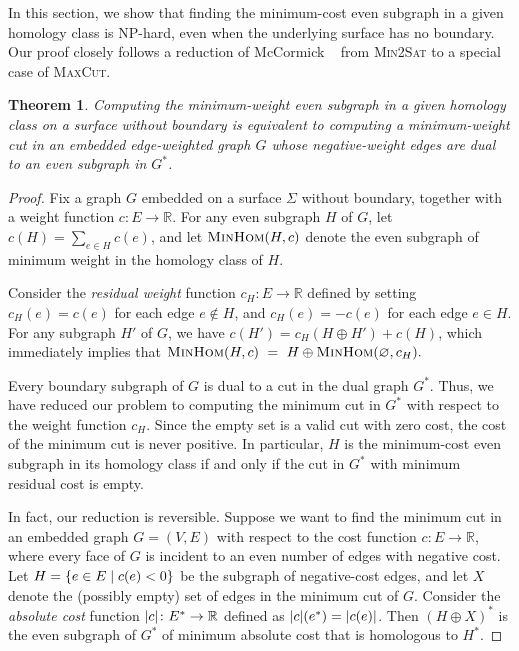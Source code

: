 \documentclass[11pt,twoside]{article}
\def\Real{\mathbb{R}}
\newtheorem{theorem}{Theorem}[section]
\begin{document}
{

In this section, we show that finding the minimum-cost even subgraph in a given homology class is {NP}-hard, even when the underlying surface has no boundary.  Our proof closely follows a reduction of McCormick \etal~\cite{mrr-edofm-03} from \textsc{Min2Sat} to a special case of \textsc{MaxCut}.

\begin{theorem}
Computing the minimum-weight even subgraph in a given homology class on a surface without boundary is equivalent to computing a minimum-weight cut in an embedded edge-weighted graph $G$ whose negative-weight edges are dual to an even subgraph in $G^*$.
\end{theorem}

\begin{proof}
Fix a graph $G$ embedded on a surface $\Sigma$ without boundary, together with a weight function $c\colon E\to \Real$.  For any even subgraph $H$ of $G$, let $c(H) = \sum_{e\in H} c(e)$, and let $\textsc{MinHom}(H,c)$ denote the even subgraph of minimum weight in the homology class of $H$.

Consider the \emph{residual weight} function $c_H\colon E\to \Real$ defined by setting $c_H(e) = c(e)$ for each edge $e\not\in H$, and $c_H(e) = -c(e)$ for each edge $e\in H$.  For any subgraph $H'$ of $G$, we have $c(H') = c_H(H\oplus H') + c(H)$, which immediately implies that
\(
    \textsc{MinHom}(H,c) ~=~
    H \oplus \textsc{MinHom}(\varnothing, c_H).
\)

Every boundary subgraph of $G$ is dual to a cut in the dual graph $G^*$.  Thus, we have reduced our problem to computing the minimum cut in $G^*$ with respect to the weight function $c_H$.  Since the empty set is a valid cut with zero cost, the cost of the minimum cut is never positive.  In particular, $H$ is the minimum-cost even subgraph in its homology class if and only if the cut in $G^*$ with minimum residual cost is empty.

In fact, our reduction is reversible.  Suppose we want to find the minimum cut in an embedded graph $G = (V, E)$ with respect to the cost function $c\colon E\to \Real$, where every face of $G$ is incident to an even number of edges with negative cost.  Let $H = \{ {e\in E}\mid {c(e)<0} \}$ be the subgraph of negative-cost edges, and let $X$ denote the (possibly empty) set of edges in the minimum cut of $G$.  Consider the \emph{absolute cost} function $\abs{c}\colon E^*\to \Real$ defined as $\mathopen| c \mathclose|(e^*) = \mathopen| c(e) \mathclose|$.  Then $(H\oplus X)^*$ is the even subgraph of $G^*$ of minimum absolute cost that is homologous to $H^*$.
\end{proof}

}
\end{document}
